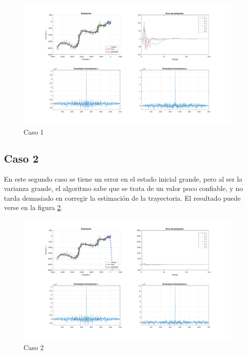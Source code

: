 		\begin{figure}[H]
			\centering
			\includegraphics[width=1.0\textwidth,keepaspectratio]{Figuras/graf_ej3a.pdf}
			\caption{Caso 1}
			\label{fig:ej3a}
		\end{figure}
	
	\subsection{Caso 2}
	
	En este segundo caso se tiene un error en el estado inicial grande, pero al ser la varianza grande, el algoritmo sabe que se trata de un valor poco confiable, y no tarda demasiado en corregir la estimación de la trayectoria. El resultado puede verse en la figura \ref{fig:ej3b}.
		
		\begin{figure}[H]
			\centering
			\includegraphics[width=1.0\textwidth,keepaspectratio]{Figuras/graf_ej3b.pdf}
			\caption{Caso 2}
			\label{fig:ej3b}
		\end{figure}
	
